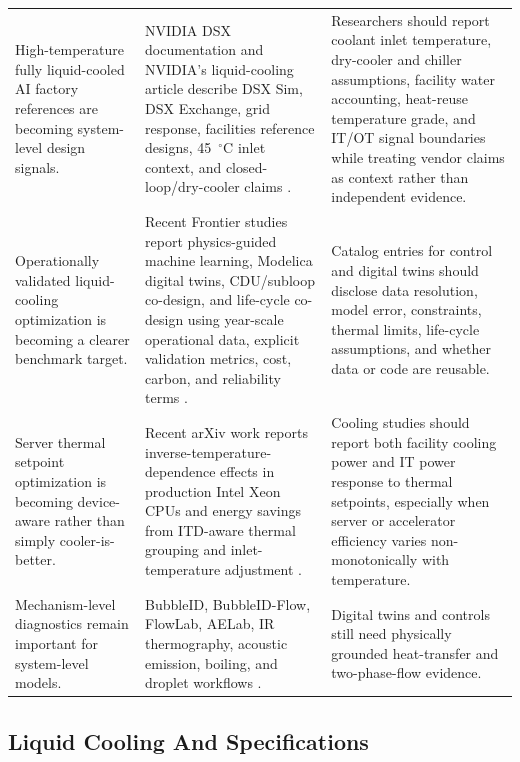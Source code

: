 \documentclass[11pt]{article}
\begin{document}
\begin{table}[t]
\begin{tabularx}{\textwidth}{p{}X X}
\addlinespace
High-temperature fully liquid-cooled AI factory references are becoming system-level design signals. & NVIDIA DSX documentation and NVIDIA's liquid-cooling article describe DSX Sim, DSX Exchange, grid response, facilities reference designs, 45~$^\circ$C inlet context, and closed-loop/dry-cooler claims \cite{NVIDIADSX2026,NVIDIALiquidCooling2026}. & Researchers should report coolant inlet temperature, dry-cooler and chiller assumptions, facility water accounting, heat-reuse temperature grade, and IT/OT signal boundaries while treating vendor claims as context rather than independent evidence. \\
\addlinespace
Operationally validated liquid-cooling optimization is becoming a clearer benchmark target. & Recent Frontier studies report physics-guided machine learning, Modelica digital twins, CDU/subloop co-design, and life-cycle co-design using year-scale operational data, explicit validation metrics, cost, carbon, and reliability terms \cite{JadhavMLCooling2026,JadhavDigitalTwin2026,JadhavCoDesign2026,JadhavLifeCycle2026}. & Catalog entries for control and digital twins should disclose data resolution, model error, constraints, thermal limits, life-cycle assumptions, and whether data or code are reusable. \\
\addlinespace
Server thermal setpoint optimization is becoming device-aware rather than simply cooler-is-better. & Recent arXiv work reports inverse-temperature-dependence effects in production Intel Xeon CPUs and energy savings from ITD-aware thermal grouping and inlet-temperature adjustment \cite{CropITD2026}. & Cooling studies should report both facility cooling power and IT power response to thermal setpoints, especially when server or accelerator efficiency varies non-monotonically with temperature. \\
\addlinespace
Mechanism-level diagnostics remain important for system-level models. & BubbleID, BubbleID-Flow, FlowLab, AELab, IR thermography, acoustic emission, boiling, and droplet workflows \cite{BubbleID2026,BubbleIDFlow2026}. & Digital twins and controls still need physically grounded heat-transfer and two-phase-flow evidence. \\
\bottomrule
\end{tabularx}
\end{table}

\subsection{Liquid Cooling And Specifications}
\end{document}
